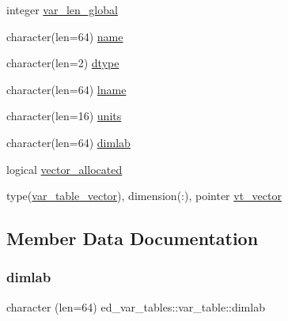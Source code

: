 \begin{DoxyCompactItemize}
integer \hyperlink{structed__var__tables_1_1var__table_a91dcf30550c2ee08ef0b4d74e7b8b64f}{var\+\_\+len\+\_\+global}
\item 
character(len=64) \hyperlink{structed__var__tables_1_1var__table_a0af071c5053800dc0920095f9ad100e3}{name}
\item 
character(len=2) \hyperlink{structed__var__tables_1_1var__table_a9c4a28ac74562c96c391f23cc8129805}{dtype}
\item 
character(len=64) \hyperlink{structed__var__tables_1_1var__table_a8e810273668252a3361505190f597c1e}{lname}
\item 
character(len=16) \hyperlink{structed__var__tables_1_1var__table_a08749e252d2a12144da6bf5bd1956f26}{units}
\item 
character(len=64) \hyperlink{structed__var__tables_1_1var__table_a0909c2a3703ab2bdf07815ad0ba14aae}{dimlab}
\item 
logical \hyperlink{structed__var__tables_1_1var__table_a41255913720040623a6bf9dd5b8267c5}{vector\+\_\+allocated}
\item 
type(\hyperlink{structed__var__tables_1_1var__table__vector}{var\+\_\+table\+\_\+vector}), dimension(\+:), pointer \hyperlink{structed__var__tables_1_1var__table_a3eacba058cb9fcc8bef162cbcfb0d106}{vt\+\_\+vector}
\end{DoxyCompactItemize}


\subsection{Member Data Documentation}
\mbox{\label{structed__var__tables_1_1var__table_a0909c2a3703ab2bdf07815ad0ba14aae}} 
\subsubsection{\texorpdfstring{dimlab}{dimlab}}
{\footnotesize\ttfamily character (len=64) ed\+\_\+var\+\_\+tables\+::var\+\_\+table\+::dimlab}

\mbox{\label{structed__var__tables_1_1var__table_a9c4a28ac74562c96c391f23cc8129805}} 
